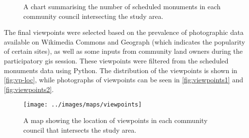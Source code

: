 \begin{figure}
  \centering
  \caption{A chart summarising the number of scheduled monuments in each community council intersecting the study area. \label{fig:sm-cc}}
\end{figure}

The final viewpoints were selected based on the prevalence of photographic data available on Wikimedia Commons and Geograph \autocite{wikimedia,geograph-uk} (which indicates the popularity of certain sites), as well as some inputs from community land owners during the participatory \gls{gis} session. These viewpoints were filtered from the scheduled monuments data using Python. The distribution of the viewpoints is shown in \autoref{fig:vp-loc}, while photographs of viewpoints can be seen in \autoref{fig:viewpoints1} and \autoref{fig:viewpoints2}.

\begin{figure}
  \centering
  \texttt{[image: ../images/maps/viewpoints]}
  \caption{A map showing the location of viewpoints in each community council that intersects the study area. \label{fig:vp-loc}}
\end{figure}

